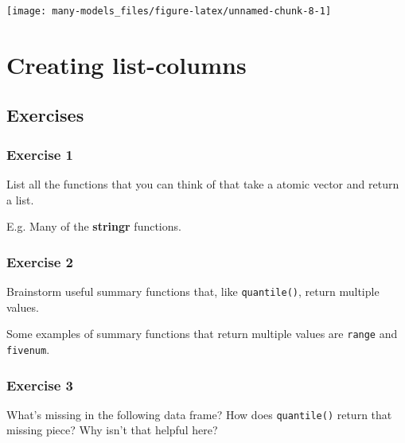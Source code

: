 \documentclass[]{book}
\newenvironment{Shaded}{\begin{snugshade}}{\end{snugshade}}
\newcommand{\CommentTok}[1]{\textcolor[rgb]{0.56,0.35,0.01}{\textit{#1}}}
\newcommand{\DataTypeTok}[1]{\textcolor[rgb]{0.13,0.29,0.53}{#1}}
\newcommand{\KeywordTok}[1]{\textcolor[rgb]{0.13,0.29,0.53}{\textbf{#1}}}
\newcommand{\NormalTok}[1]{#1}
\newcommand{\OperatorTok}[1]{\textcolor[rgb]{0.81,0.36,0.00}{\textbf{#1}}}
\newcommand{\StringTok}[1]{\textcolor[rgb]{0.31,0.60,0.02}{#1}}
\theoremstyle{plain}
\theoremstyle{remark}
\theoremstyle{definition}
\theoremstyle{definition}
\theoremstyle{definition}
\theoremstyle{remark}
\begin{document}
\begin{center}\texttt{[image: many-models\_files/figure-latex/unnamed-chunk-8-1]} \end{center}

\hypertarget{creating-list-columns}{%
\section{Creating list-columns}\label{creating-list-columns}}

\hypertarget{exercises-4}{%
\subsection{Exercises}\label{exercises-4}}

\hypertarget{exercise-1-68}{%
\subsubsection{Exercise 1}\label{exercise-1-68}}

List all the functions that you can think of that take a atomic vector
and return a list.

E.g. Many of the \textbf{stringr} functions.

\hypertarget{exercise-2-66}{%
\subsubsection{Exercise 2}\label{exercise-2-66}}

Brainstorm useful summary functions that, like \texttt{quantile()},
return multiple values.

Some examples of summary functions that return multiple values are
\texttt{range} and \texttt{fivenum}.

\hypertarget{exercise-3-53}{%
\subsubsection{Exercise 3}\label{exercise-3-53}}

What's missing in the following data frame? How does \texttt{quantile()}
return that missing piece? Why isn't that helpful here?

\begin{Shaded}
\end{Shaded}
\end{document}
